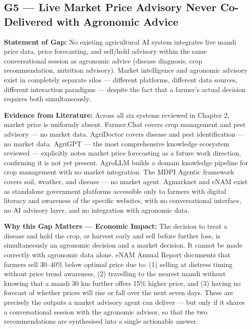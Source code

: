\documentclass[12pt,a4paper]{article}
\begin{document}
\subsection{G5 --- Live Market Price Advisory Never Co-Delivered with Agronomic Advice}
\textbf{Statement of Gap:}
No existing agricultural AI system integrates live mandi price data, price forecasting, and sell/hold advisory within the same conversational session as agronomic advice (disease diagnosis, crop recommendation, nutrition advisory). Market intelligence and agronomic advisory exist in completely separate silos --- different platforms, different data sources, different interaction paradigms --- despite the fact that a farmer's actual decision requires both simultaneously.

\noindent\textbf{Evidence from Literature:}
Across all six systems reviewed in Chapter 2, market price is uniformly absent. Farmer.\allowbreak Chat \cite{farmerchat2024} covers crop management and pest advisory --- no market data. AgriDoctor \cite{agridoctor2025} covers disease and pest identification --- no market data. AgriGPT \cite{agrigpt2025} --- the most comprehensive knowledge ecosystem reviewed --- explicitly notes market price forecasting as a future work direction, confirming it is not yet present. AgroLLM \cite{agrollm2025} builds a domain knowledge pipeline for crop management with no market integration. The MDPI Agentic framework \cite{agenticmdpi2026} covers soil, weather, and disease --- no market agent. Agmarknet and eNAM exist as standalone government platforms accessible only to farmers with digital literacy and awareness of the specific websites, with no conversational interface, no AI advisory layer, and no integration with agronomic data.

\noindent\textbf{Why this Gap Matters --- Economic Impact:}
The decision to treat a disease and hold the crop, or harvest early and sell before further loss, is simultaneously an agronomic decision and a market decision. It cannot be made correctly with agronomic data alone. eNAM Annual Report \cite{enam2023} documents that farmers sell 30--40\% below optimal price due to: (1) selling at distress timing without price trend awareness, (2) travelling to the nearest mandi without knowing that a mandi 30 km further offers 15\% higher price, and (3) having no forecast of whether prices will rise or fall over the next seven days. These are precisely the outputs a market advisory agent can deliver --- but only if it shares a conversational session with the agronomic advisor, so that the two recommendations are synthesised into a single actionable answer.
\end{document}
